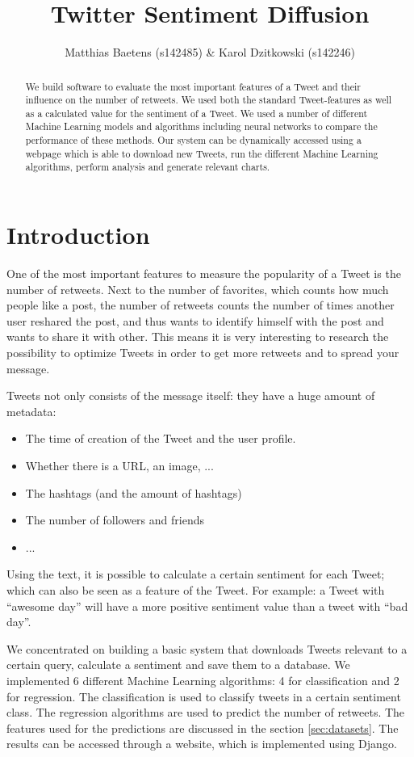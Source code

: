\documentclass[10pt]{IEEEtran}
\title{Twitter Sentiment Diffusion}
\author{Matthias Baetens (s142485) \& Karol Dzitkowski (s142246)}
\begin{document}
\maketitle

\begin{abstract}
We build software to evaluate the most important features of a Tweet and their influence on the number of retweets. We used both the standard Tweet-features as well as a calculated value for the sentiment of a Tweet. We used a number of different Machine Learning models and algorithms including neural networks to compare the performance of these methods. Our system can be dynamically accessed using a webpage which is able to download new Tweets, run the different Machine Learning algorithms, perform analysis and generate relevant charts. 
\end{abstract}

\section{Introduction}
One of the most important features to measure the popularity of a Tweet is the number of retweets. Next to the number of favorites, which counts how much people like a post, the number of retweets counts the number of times another user reshared the post, and thus wants to identify himself with the post and wants to share it with other. This means it is very interesting to research the possibility to optimize Tweets in order to get more retweets and to spread your message. 

Tweets not only consists of the message itself: they have a huge amount of metadata: 
\begin{itemize}
	\item The time of creation of the Tweet and the user profile.
	\item Whether there is a URL, an image, ...
	\item The hashtags (and the amount of hashtags)
	\item The number of followers and friends
	\item ...
\end{itemize}

Using the text, it is possible to calculate a certain sentiment for each Tweet; which can also be seen as a feature of the Tweet. For example: a Tweet with ``awesome day'' will have a more positive sentiment value than a tweet with ``bad day''.

We concentrated on building a basic system that downloads Tweets relevant to a certain query, calculate a sentiment and save them to a database. We implemented 6 different Machine Learning algorithms: 4 for classification and 2 for regression. The classification is used to classify tweets in a certain sentiment class. The regression algorithms are used to predict the number of retweets. The features used for the predictions are discussed in the section \ref{sec:datasets}. The results can be accessed through a website, which is implemented using Django.
\end{document}
